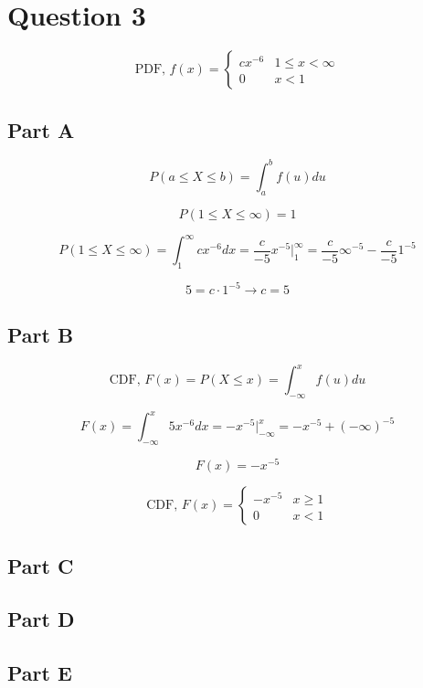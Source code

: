 \documentclass[letterpaper]{article}
\begin{document}
\newpage

\section*{Question 3}

$$
    \text{PDF, } f(x) = \begin{cases} cx^{-6} & 1 \leq x < \infty \\ 0 & x < 1 \end{cases}
$$

\subsection*{Part A}

$$P(a \leq X \leq b) = \int_a^b f(u)du$$

$$P(1 \leq X \leq \infty) = 1$$

$$P(1 \leq X \leq \infty) = \int_1^{\infty} c x^{-6} dx = \frac{c}{-5} x^{-5} \Big|_1^{\infty} = \frac{c}{-5} \infty^{-5} - \frac{c}{-5} 1^{-5}$$

$$5 = c \cdot 1^{-5} \longrightarrow c = 5$$

\subsection*{Part B}

$$\text{CDF, } F(x) = P(X \leq x) = \int_{- \infty}^x f(u)du$$

$$F(x) = \int_{- \infty}^x 5 x^{-6} dx = -x^{-5} \Big|_{- \infty}^{x} = -x^{-5} + (- \infty)^{-5}$$

$$F(x) = -x^{-5}$$

$$\text{CDF, } F(x) =\begin{cases}
        -x^{-5}     &   x \geq 1    \\
        0           &   x < 1
\end{cases} $$

\subsection*{Part C}

\subsection*{Part D}

\subsection*{Part E}
\end{document}
